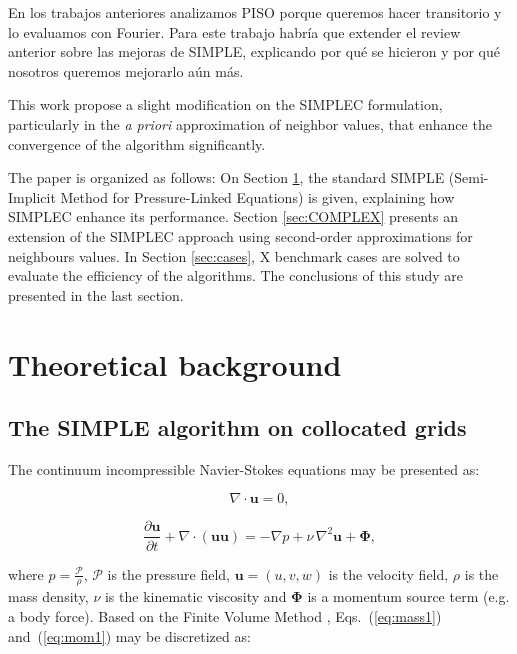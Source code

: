 \documentclass[final,3p,times,10pt,onecolumn]{myElsarticle}
\numberwithin{equation}{section}
\newcommand{\COM}[1]{{\color{green} #1}}
\newcommand{\CIP}[1]{{\color{blue} #1}}
\begin{document}
\CIP{En los trabajos anteriores analizamos PISO porque queremos hacer transitorio y lo evaluamos con Fourier. Para este trabajo habría que extender el review anterior sobre las mejoras de SIMPLE, explicando por qué se hicieron y por qué nosotros queremos mejorarlo aún más.}


This work propose \CIP{a slight modification on the SIMPLEC formulation, particularly in the \textit{a priori} approximation of neighbor values, that enhance the convergence of the algorithm significantly}.

The paper is organized as follows: On Section \ref{sec:theory}, the standard SIMPLE (Semi-Implicit Method for Pressure-Linked Equations) is given, explaining how SIMPLEC enhance its performance. Section \ref{sec:COMPLEX} presents an extension of the SIMPLEC approach using second-order approximations for neighbours values. In Section \ref{sec:cases}, \COM{X} benchmark cases are solved to evaluate the efficiency of the algorithms. The conclusions of this study are presented in the last section.


\section{Theoretical background} \label{sec:theory}

\subsection{The SIMPLE algorithm on collocated grids}

The continuum incompressible Navier-Stokes equations may be presented as:

\begin{equation}
\displaystyle \nabla \cdotp \boldsymbol{u} = 0, 
\label{eq:mass1}
\end{equation}

\begin{equation}
\displaystyle \frac{\partial \boldsymbol{u}}{\partial t} + \nabla \cdotp (\boldsymbol{u} \boldsymbol{u}) = -\nabla p + \nu\, \nabla^2 \boldsymbol{u} + \boldsymbol{\Phi},
\label{eq:mom1}
\end{equation}

\noindent where $\displaystyle p = \frac{\mathcal{P}}{\rho}$, $\mathcal{P}$ is the pressure field, $\boldsymbol{u} = (u,v,w)$ is the velocity field, {\color{red}$\rho$ is the mass density, }$\nu$ is the kinematic viscosity and $\mathbf{\Phi}$ is a momentum source term (e.g. a body force).
Based on the Finite Volume Method \cite{jasak}, Eqs.~(\ref{eq:mass1}) and~(\ref{eq:mom1}) may be discretized as:
\end{document}
